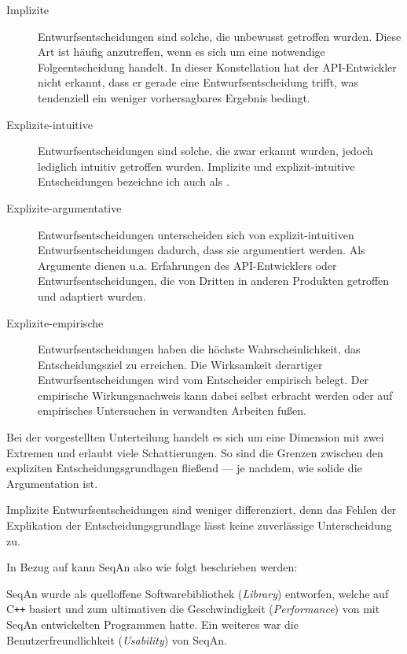 \begin{itemize}
  \begin{description}
    \item[Implizite] Entwurfsentscheidungen sind solche, die unbewusst getroffen wurden. Diese Art ist häufig anzutreffen, wenn es sich um eine notwendige Folgeentscheidung handelt. In dieser Konstellation hat der API-Entwickler nicht erkannt, dass er gerade eine Entwurfsentscheidung trifft, was tendenziell ein weniger vorhersagbares Ergebnis bedingt.
    \item[Explizite-intuitive] Entwurfsentscheidungen sind solche, die zwar erkannt wurden, jedoch lediglich intuitiv getroffen wurden. Implizite und explizit-intuitive Entscheidungen bezeichne ich auch als . \label{sec:bauch-usability}
    \item[Explizite-argumentative] Entwurfsentscheidungen unterscheiden sich von explizit-intuitiven Entwurfsentscheidungen dadurch, dass sie argumentiert werden. Als Argumente dienen u.a. Erfahrungen des API-Entwicklers oder Entwurfsentscheidungen, die von Dritten in anderen Produkten getroffen und adaptiert wurden.
    \item[Explizite-empirische] Entwurfsentscheidungen haben die höchste Wahrscheinlichkeit, das Entscheidungsziel zu erreichen. Die Wirksamkeit derartiger Entwurfsentscheidungen wird vom Entscheider empirisch belegt. Der empirische Wirkungsnachweis kann dabei selbst erbracht werden oder auf empirisches Untersuchen in verwandten Arbeiten fußen. 
  \end{description}
  
  Bei der vorgestellten Unterteilung handelt es sich um eine Dimension mit zwei Extremen und erlaubt viele Schattierungen. So sind die Grenzen zwischen den expliziten Entscheidungsgrundlagen fließend --- je nachdem, wie solide die Argumentation ist.
  
  Implizite Entwurfsentscheidungen sind weniger differenziert, denn das Fehlen der Explikation der Entscheidungsgrundlage lässt keine zuverlässige Unterscheidung zu.
\end{itemize}

\bigskip

In Bezug auf  kann SeqAn also wie folgt beschrieben werden:

SeqAn wurde als quelloffene Softwarebibliothek (\textit{Library}) entworfen, welche auf C{}\verb!++! basiert und zum ultimativen  die Geschwindigkeit (\textit{Performance}) von mit SeqAn entwickelten Programmen hatte. Ein weiteres  war die Benutzerfreundlichkeit (\textit{Usability}) von SeqAn.


